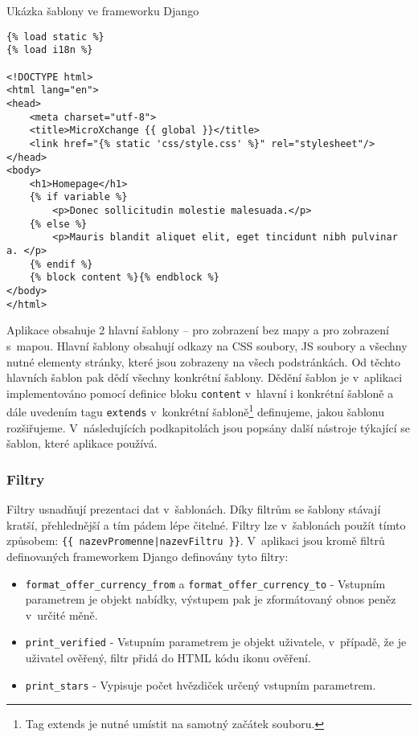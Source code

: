 \begin{listing}[htbp]
\caption{\label{code:django-template}Ukázka šablony ve frameworku Django}
\begin{verbatim}
{% load static %}
{% load i18n %}

<!DOCTYPE html>
<html lang="en">
<head>
    <meta charset="utf-8">
    <title>MicroXchange {{ global }}</title>
    <link href="{% static 'css/style.css' %}" rel="stylesheet"/>
</head>
<body>
    <h1>Homepage</h1>
    {% if variable %}
        <p>Donec sollicitudin molestie malesuada.</p>
    {% else %}
        <p>Mauris blandit aliquet elit, eget tincidunt nibh pulvinar a. </p>
    {% endif %}
    {% block content %}{% endblock %}
</body>
</html>
\end{verbatim}
\end{listing}

Aplikace obsahuje 2 hlavní šablony -- pro zobrazení bez mapy a pro zobrazení s~mapou. Hlavní šablony obsahují odkazy na CSS soubory, JS soubory a všechny nutné elementy stránky, které jsou zobrazeny na všech podstránkách. Od těchto hlavních šablon pak dědí všechny konkrétní šablony. Dědění šablon je v~aplikaci implementováno pomocí definice bloku \texttt{content} v~hlavní i konkrétní šabloně a dále uvedením tagu \texttt{extends} v~konkrétní šabloně\footnote{Tag extends je nutné umístit na samotný začátek souboru.} definujeme, jakou šablonu rozšiřujeme. V~následujících podkapitolách jsou popsány další nástroje týkající se šablon, které aplikace používá.

\subsubsection{Filtry}
Filtry usnadňují prezentaci dat v~šablonách. Díky filtrům se šablony stávají kratší, přehlednější a tím pádem lépe čitelné. Filtry lze v~šablonách použít tímto způsobem: \mbox{\texttt{\{\{ nazevPromenne|nazevFiltru \}\}}}. V~aplikaci jsou kromě filtrů definovaných frameworkem Django definovány tyto filtry:
\begin{itemize}
    \item \texttt{format\_offer\_currency\_from} a \texttt{format\_offer\_currency\_to} - Vstupním parametrem je objekt nabídky, výstupem pak je zformátovaný obnos peněz v~určité měně.
    \item \texttt{print\_verified} - Vstupním parametrem je objekt uživatele, v~případě, že je uživatel ověřený, filtr přidá do HTML kódu ikonu ověření.
    \item \texttt{print\_stars} - Vypisuje počet hvězdiček určený vstupním parametrem.
\end{itemize}

